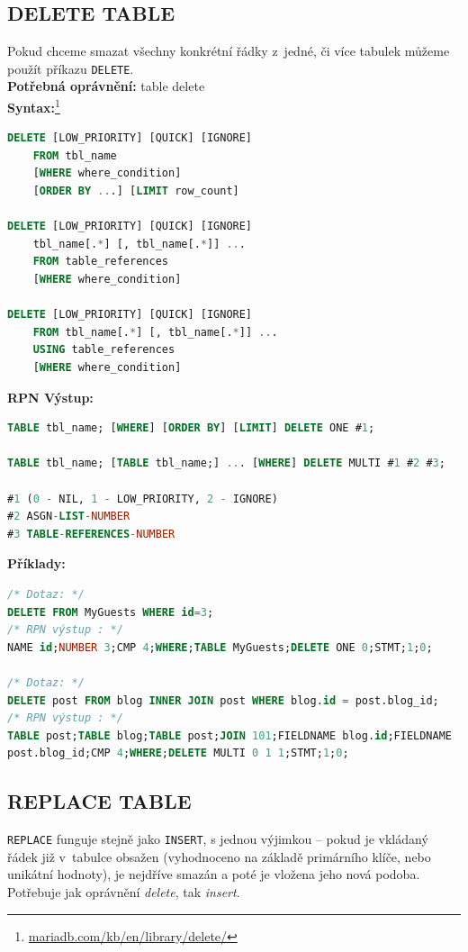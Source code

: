 \subsection{DELETE TABLE} \label{subsec:6:deletetbl}
Pokud chceme smazat všechny konkrétní řádky z~jedné, či více tabulek můžeme použít příkazu \texttt{DELETE}. \\

\textbf{Potřebná oprávnění:} table delete \\

\textbf{Syntax:}\footnote{\url{mariadb.com/kb/en/library/delete/}}
\begin{lstlisting}[language=sql]
DELETE [LOW_PRIORITY] [QUICK] [IGNORE] 
    FROM tbl_name 
    [WHERE where_condition]
    [ORDER BY ...] [LIMIT row_count]

DELETE [LOW_PRIORITY] [QUICK] [IGNORE]
    tbl_name[.*] [, tbl_name[.*]] ...
    FROM table_references
    [WHERE where_condition]

DELETE [LOW_PRIORITY] [QUICK] [IGNORE]
    FROM tbl_name[.*] [, tbl_name[.*]] ...
    USING table_references
    [WHERE where_condition]
\end{lstlisting}
\vspace*{\baselineskip}
\textbf{RPN Výstup:}
\begin{lstlisting}[language=sql]
TABLE tbl_name; [WHERE] [ORDER BY] [LIMIT] DELETE ONE #1;

TABLE tbl_name; [TABLE tbl_name;] ... [WHERE] DELETE MULTI #1 #2 #3;

#1 (0 - NIL, 1 - LOW_PRIORITY, 2 - IGNORE)
#2 ASGN-LIST-NUMBER
#3 TABLE-REFERENCES-NUMBER
\end{lstlisting}
\vspace*{\baselineskip}
\textbf{Příklady:}
\begin{lstlisting}[language=sql]
/* Dotaz: */
DELETE FROM MyGuests WHERE id=3;
/* RPN výstup : */
NAME id;NUMBER 3;CMP 4;WHERE;TABLE MyGuests;DELETE ONE 0;STMT;1;0;

/* Dotaz: */
DELETE post FROM blog INNER JOIN post WHERE blog.id = post.blog_id;
/* RPN výstup : */
TABLE post;TABLE blog;TABLE post;JOIN 101;FIELDNAME blog.id;FIELDNAME 
post.blog_id;CMP 4;WHERE;DELETE MULTI 0 1 1;STMT;1;0;
\end{lstlisting}

\subsection{REPLACE TABLE} \label{subsec:6:replacetbl}
\texttt{REPLACE} funguje stejně jako \texttt{INSERT}, s jednou výjimkou -- pokud je vkládaný řádek již v~tabulce obsažen
 (vyhodnoceno na základě primárního klíče, nebo unikátní hodnoty), je nejdříve smazán a poté je vložena jeho nová podoba. 
 Potřebuje jak oprávnění \textit{delete}, tak \textit{insert}. \\

